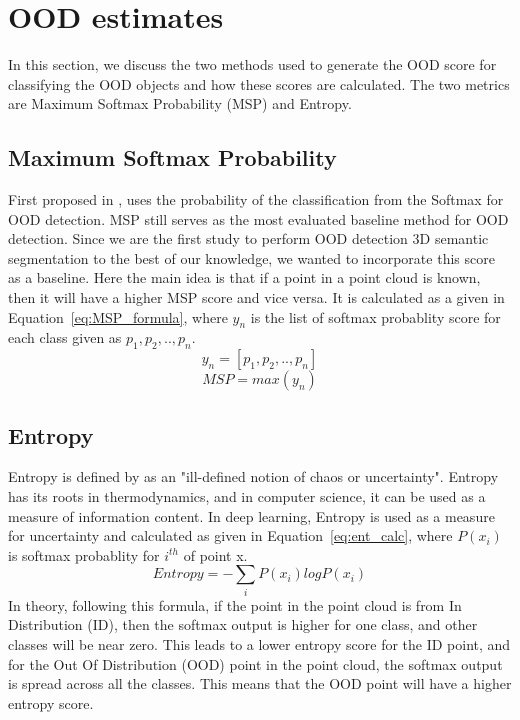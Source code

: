 \section{OOD estimates}
In this section, we discuss the two methods used to generate the OOD score for classifying the OOD objects and how these scores are calculated.
The two metrics are Maximum Softmax Probability (MSP) and Entropy.

\subsection{Maximum Softmax Probability}
First proposed in \cite{hendrycks2016baseline_MSP}, uses the probability of the classification from the Softmax for OOD detection. 
MSP still serves as the most evaluated baseline method for OOD detection.
Since we are the first study to perform OOD detection 3D semantic segmentation to the best of our knowledge, we wanted to incorporate this score as a baseline. 
Here the main idea is that if a point in a point cloud is known, then it will have a higher MSP score and vice versa.
It is calculated as a given in Equation~\ref{eq:MSP_formula}, where $y_n$ is the list of softmax probablity score for each class given as $p_1, p_2, .., p_n$.
$$y_n = [p_1, p_2,..,p_n]$$
\begin{equation}
    MSP = max(y_n)
    \label{eq:MSP_formula}
\end{equation}

\subsection{Entropy}
\label{sec:meth_entropy}
Entropy is defined by \cite{entropy_robinson} as an "ill-defined notion of chaos or uncertainty".
Entropy has its roots in thermodynamics, and in computer science, it can be used as a measure of information content.
In deep learning, Entropy is used as a measure for uncertainty and calculated as given in Equation~\ref{eq:ent_calc}, where $P(x_i)$ is softmax probablity for $i^{th}$ of point x.
\begin{equation}
    Entropy = -\sum_i P(x_i) log P(x_i)
    \label{eq:ent_calc}
\end{equation}
In theory, following this formula, if the point in the point cloud is from In Distribution (ID), then the softmax output is higher for one class, and other classes will be near zero.
This leads to a lower entropy score for the ID point, and for the Out Of Distribution (OOD) point in the point cloud, the softmax output is spread across all the classes.
This means that the OOD point will have a higher entropy score.

